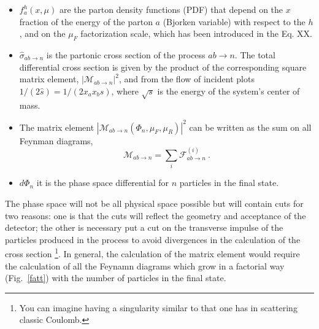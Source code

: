 \begin{itemize}
\item $f_{a}^{h} (x , \mu)$ are the parton density functions (PDF) that depend on the $x$ fraction of the energy of the parton $a$ (Bjorken variable) with respect to the $h$, and on the $\mu_F $ factorization scale, which has been  introduced  in the Eq. XX.

\item $\hat {\sigma}_ {ab\rightarrow n} $ is the partonic cross section of the process $ ab \rightarrow n $.
The total differential cross section is given by the product of the corresponding square matrix element, $ | \mathcal {M}_{ab \rightarrow n} |^2 $, and from the flow of incident plots $ 1 / (2 \hat{s}) = 1 / (2 x_a x_b s) $, where $ \sqrt{s} $ is the energy of the system's center of mass.

\item The matrix element $| \mathcal{M}_{ab \rightarrow n}  (\Phi_n , \mu_F , \mu_R) |^2 $  can be written as the sum on all Feynman diagrams,
\begin{equation}
\mathcal{M}_{ab \rightarrow n}= \sum_{i} \mathcal{F}_{ab \rightarrow n}^{(i)} \: \mbox{.} \end{equation}

\item $d\Phi_n$ it is the phase space differential for $ n $ particles in the final state.
\end{itemize}

 The phase space will not be all physical space possible but will contain cuts for two reasons: one is that  the cuts will reflect the geometry and acceptance of the detector; the other   is necessary put a cut on the transverse impulse of the particles produced in the process to avoid divergences in the calculation of the cross section \footnote {You can imagine having a singularity similar to that one has in scattering  classic Coulomb.}.
In general, the calculation of the matrix element would require the calculation of all the Feynamn diagrams which  grow in a factorial way (Fig.~\ref{fatt}) with the number of particles in the final state.

